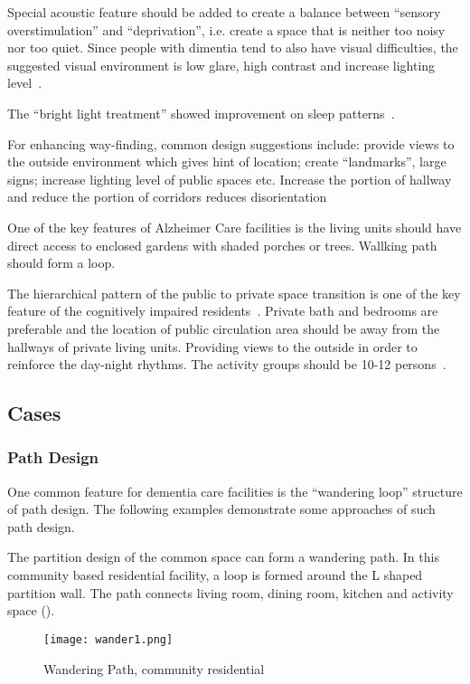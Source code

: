 Special acoustic feature should be added to create a
balance between ``sensory overstimulation'' and ``deprivation'',
i.e. create a space that is neither too noisy nor too quiet. Since
people with dimentia tend to also have visual difficulties, the
suggested visual environment is low glare, high contrast and increase
lighting level~\cite{Day2000}. 

The ``bright light treatment'' showed improvement on sleep
patterns~\cite{Mishima1994}. 

For enhancing way-finding, common design suggestions include: provide
views to the outside environment which gives hint of location; create
``landmarks'', large signs; increase lighting level of public spaces
etc. Increase the portion of hallway and reduce the portion of
corridors reduces disorientation~\cite{Day2000}

One of the key features of Alzheimer Care facilities is the living
units should have direct access to enclosed gardens with shaded
porches or trees. Wallking path should form a loop.

The hierarchical pattern of the public to private space transition is
one of the key feature of the cognitively impaired
residents~\cite{seniorLiving}. Private bath and bedrooms are
preferable and the location of public circulation area should be away
from the hallways of private living units. Providing views to the
outside in order to reinforce the day-night rhythms. The activity
groups should be 10-12 persons~\cite{seniorLiving}.

\subsection{Cases}
\subsubsection{Path Design}
One common feature for dementia care facilities is the ``wandering
loop'' structure of path design. The following examples demonstrate
some approaches of such path design.

The partition design of the common space can form a wandering path. In
this community based residential facility, a loop is formed around the
L shaped partition wall. The path connects living room, dining room,
kitchen and activity space ().

\begin{figure}[htbp]
  \centering
  \texttt{[image: wander1.png]}
  \caption[Wandering Path, Community Based Residential]{Wandering
    Path, community residential~\cite{dementiaCase}}
  \label{fig:wander1}
\end{figure}

